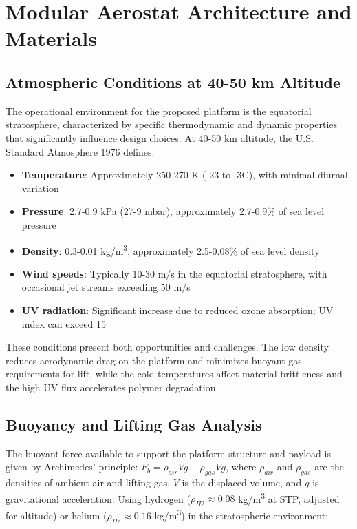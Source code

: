 \section{Modular Aerostat Architecture and Materials}
\label{sec:aerostat}

\subsection{Atmospheric Conditions at 40-50 km Altitude}
The operational environment for the proposed platform is the equatorial stratosphere, characterized by specific thermodynamic and dynamic properties that significantly influence design choices. At 40-50 km altitude, the U.S. Standard Atmosphere 1976 \cite{ussa1976} defines:
\begin{itemize}
    \item \textbf{Temperature}: Approximately 250-270 K (-23 to -3\textdegree{}C), with minimal diurnal variation
    \item \textbf{Pressure}: 2.7-0.9 kPa (27-9 mbar), approximately 2.7-0.9\% of sea level pressure
    \item \textbf{Density}: 0.3-0.01 kg/m\textsuperscript{3}, approximately 2.5-0.08\% of sea level density
    \item \textbf{Wind speeds}: Typically 10-30 m/s in the equatorial stratosphere, with occasional jet streams exceeding 50 m/s \cite{holton2004}
    \item \textbf{UV radiation}: Significant increase due to reduced ozone absorption; UV index can exceed 15 \cite{blumthaler1997}
\end{itemize}
These conditions present both opportunities and challenges. The low density reduces aerodynamic drag on the platform and minimizes buoyant gas requirements for lift, while the cold temperatures affect material brittleness and the high UV flux accelerates polymer degradation.

\subsection{Buoyancy and Lifting Gas Analysis}
The buoyant force available to support the platform structure and payload is given by Archimedes' principle: $F_b = \rho_{air} V g - \rho_{gas} V g$, where $\rho_{air}$ and $\rho_{gas}$ are the densities of ambient air and lifting gas, $V$ is the displaced volume, and $g$ is gravitational acceleration. Using hydrogen ($\rho_{H2} \approx 0.08$ kg/m\textsuperscript{3} at STP, adjusted for altitude) or helium ($\rho_{He} \approx 0.16$ kg/m\textsuperscript{3}) in the stratospheric environment:

